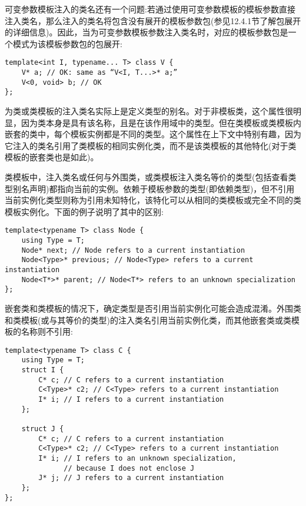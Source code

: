 可变参数模板注入的类名还有一个问题:若通过使用可变参数模板的模板参数直接注入类名，那么注入的类名将包含没有展开的模板参数包(参见12.4.1节了解包展开的详细信息)。因此，当为可变参数模板参数注入类名时，对应的模板参数包是一个模式为该模板参数包的包展开:

\begin{lstlisting}[style=styleCXX]
template<int I, typename... T> class V {
	V* a; // OK: same as “V<I, T...>* a;”
	V<0, void> b; // OK
};
\end{lstlisting}


为类或类模板的注入类名实际上是定义类型的别名。对于非模板类，这个属性很明显，因为类本身是具有该名称，且是在该作用域中的类型。但在类模板或类模板内嵌套的类中，每个模板实例都是不同的类型。这个属性在上下文中特别有趣，因为它注入的类名引用了类模板的相同实例化类，而不是该类模板的其他特化(对于类模板的嵌套类也是如此)。

类模板中，注入类名或任何与外围类，或类模板注入类名等价的类型(包括查看类型别名声明)都指向当前的实例。依赖于模板参数的类型(即依赖类型)，但不引用当前实例化类型则称为引用未知特化，该特化可以从相同的类模板或完全不同的类模板实例化。下面的例子说明了其中的区别:

\begin{lstlisting}[style=styleCXX]
template<typename T> class Node {
	using Type = T;
	Node* next; // Node refers to a current instantiation
	Node<Type>* previous; // Node<Type> refers to a current instantiation
	Node<T*>* parent; // Node<T*> refers to an unknown specialization
};
\end{lstlisting}

嵌套类和类模板的情况下，确定类型是否引用当前实例化可能会造成混淆。外围类和类模板(或与其等价的类型)的注入类名引用当前实例化类，而其他嵌套类或类模板的名称则不引用:

\begin{lstlisting}[style=styleCXX]
template<typename T> class C {
	using Type = T;
	struct I {
		C* c; // C refers to a current instantiation
		C<Type>* c2; // C<Type> refers to a current instantiation
		I* i; // I refers to a current instantiation
	};

	struct J {
		C* c; // C refers to a current instantiation
		C<Type>* c2; // C<Type> refers to a current instantiation
		I* i; // I refers to an unknown specialization,
			  // because I does not enclose J
		J* j; // J refers to a current instantiation
	};
};
\end{lstlisting}


